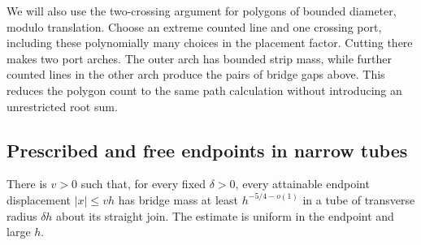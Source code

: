 We will also use the two-crossing argument for polygons of bounded
diameter, modulo translation. Choose an extreme counted line and one
crossing port, including these polynomially many choices in the placement
factor. Cutting there makes two port arches. The outer arch has bounded
strip mass, while further counted lines in the other arch produce the
pairs of bridge gaps above. This reduces the polygon count to the same
path calculation without introducing an unrestricted root sum.

\subsection{Prescribed and free endpoints in narrow tubes}

\begin{lemma}
\label{lem:08-fixed-tube}
There is \(v>0\) such that, for every fixed \(\delta>0\), every attainable
endpoint displacement \(|x|\le vh\) has bridge mass at least
\(h^{-5/4-o(1)}\) in a tube of transverse radius \(\delta h\) about its
straight join. The estimate is uniform in the endpoint and large \(h\).
\end{lemma}
